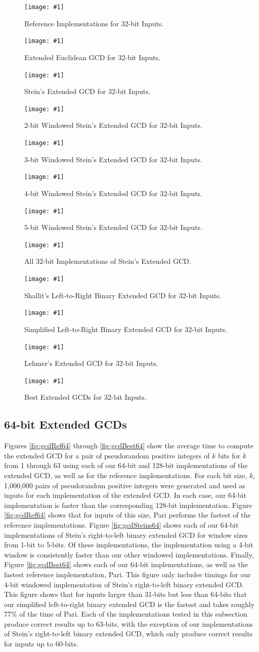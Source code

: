 \documentclass{ucalgthes1}
\theoremstyle{definition}
\newcommand{\mygraph}[3]{
	\begin{figure}[htb]
	\centering
	\texttt{[image: \#1]}
	\caption{#3}
	\label{#2}
	\end{figure}
}
\begin{document}
\mygraph{reference-impl-32}{fig:gcdRef32}{Reference Implementations for 32-bit Inputs.}
\mygraph{divrem-32}{fig:gcdDivrem32}{Extended Euclidean GCD for 32-bit Inputs.}
\mygraph{stein1-32}{fig:gcdStein1-32}{Stein's Extended GCD for 32-bit Inputs.}
\mygraph{stein2-32}{fig:gcdStein2-32}{2-bit Windowed Stein's Extended GCD for 32-bit Inputs.}
\mygraph{stein3-32}{fig:gcdStein3-32}{3-bit Windowed Stein's Extended GCD for 32-bit Inputs.}
\mygraph{stein4-32}{fig:gcdStein4-32}{4-bit Windowed Stein's Extended GCD for 32-bit Inputs.}
\mygraph{stein5-32}{fig:gcdStein5-32}{5-bit Windowed Stein's Extended GCD for 32-bit Inputs.}
\mygraph{steins-32}{fig:gcdSteins32}{All 32-bit Implementations of Stein's Extended GCD.}
\mygraph{shallit-32}{fig:gcdShallit32}{Shallit's Left-to-Right Binary Extended GCD for 32-bit Inputs.}
\mygraph{binary_l2r-32}{fig:gcdL2R32}{Simplified Left-to-Right Binary Extended GCD for 32-bit Inputs.}
\mygraph{lehmer-32}{fig:gcdLehmer32}{Lehmer's Extended GCD for 32-bit Inputs.}
\mygraph{best-32}{fig:gcdBest32}{Best Extended GCDs for 32-bit Inputs.}

\clearpage

\subsection{64-bit Extended GCDs}

Figures \ref{fig:gcdRef64} through \ref{fig:gcdBest64} show the average time to compute the extended GCD for a pair of pseudorandom positive integers of $k$ bits for $k$ from 1 through 63 using each of our 64-bit and 128-bit implementations of the extended GCD, as well as for the reference implementations.  For each bit size, $k$, 1,000,000 pairs of pseudorandom positive integers were generated and used as inputs for each implementation of the extended GCD.  In each case, our 64-bit implementation is faster than the corresponding 128-bit implementation.  Figure \ref{fig:gcdRef64} shows that for inputs of this size, Pari performs the fastest of the reference implementations.  Figure \ref{fig:gcdSteins64} shows each of our 64-bit implementations of Stein's right-to-left binary extended GCD for window sizes from 1-bit to 5-bits.  Of these implementations, the implementation using a 4-bit window is consistently faster than our other windowed implementations.  Finally, Figure \ref{fig:gcdBest64} shows each of our 64-bit implementations, as well as the fastest reference implementation, Pari.   This figure only includes timings for our 4-bit windowed implementation of Stein's right-to-left binary extended GCD.  This figure shows that for inputs larger than 31-bits but less than 64-bits that our simplified left-to-right binary extended GCD is the fastest and takes roughly 77\% of the time of Pari.   Each of the implementations tested in this subsection produce correct results up to 63-bits, with the exception of our implementations of Stein's right-to-left binary extended GCD, which only produce correct results for inputs up to 60-bits.
\end{document}
